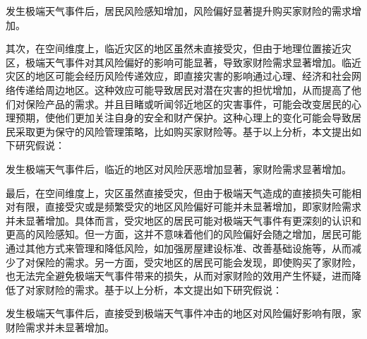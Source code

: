\begin{hyp} \label{hyp:1}
    发生极端天气事件后，居民风险感知增加，风险偏好显著提升购买家财险的需求增加。
\end{hyp}

其次，在空间维度上，临近灾区的地区虽然未直接受灾，但由于地理位置接近灾区，极端天气事件对其风险偏好的影响可能显著\citep{0Do}，导致家财险需求显著增加。临近灾区的地区可能会经历风险传递效应，即直接灾害的影响通过心理、经济和社会网络传递给周边地区。这种效应可能导致居民对潜在灾害的担忧增加，从而提高了他们对保险产品的需求。并且目睹或听闻邻近地区的灾害事件，可能会改变居民的心理预期，使他们更加关注自身的安全和财产保护。这种心理上的变化可能会导致居民采取更为保守的风险管理策略，比如购买家财险等。基于以上分析，本文提出如下研究假说：

\begin{hyp} \label{hyp:3}
    发生极端天气事件后，临近的地区对风险厌恶增加显著，家财险需求显著增加。
\end{hyp}

最后，在空间维度上，灾区虽然直接受灾，但由于极端天气造成的直接损失可能相对有限，直接受灾或是频繁受灾的地区风险偏好可能并未显著增加\citep{shao2024typhoons}，即家财险需求并未显著增加。具体而言，受灾地区的居民可能对极端天气事件有更深刻的认识和更高的风险感知。但一方面，这并不意味着他们的风险偏好会随之增加，居民可能通过其他方式来管理和降低风险，如加强房屋建设标准、改善基础设施等，从而减少了对保险的需求。另一方面，受灾地区的居民可能会发现，即使购买了家财险，也无法完全避免极端天气事件带来的损失，从而对家财险的效用产生怀疑，进而降低了对家财险的需求。基于以上分析，本文提出如下研究假说：

\begin{hyp} \label{hyp:2}
    发生极端天气事件后，直接受到极端天气事件冲击的地区对风险偏好影响有限，家财险需求并未显著增加。
\end{hyp}
